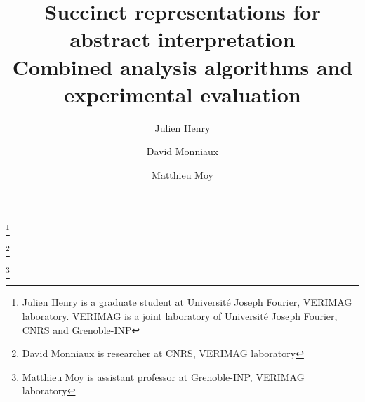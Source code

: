 \documentclass[a4paper]{amsart}
\begin{document}
\title[Succinct representations for abstract interpretation]{Succinct representations for abstract interpretation \\Combined analysis algorithms and experimental evaluation}

\author{Julien Henry}
\address{J. Henry\\VERIMAG\\2 av de Vignate\\38610 Gières\\France}
\thanks{Julien Henry is a graduate student at Université Joseph Fourier, VERIMAG laboratory. VERIMAG is a joint laboratory of Université Joseph Fourier, CNRS and Grenoble-INP}

\author{David Monniaux}
\address{D. Monniaux\\VERIMAG\\2 av de Vignate\\38610 Gières\\France}
\thanks{David Monniaux is researcher at CNRS, VERIMAG laboratory}

\author{Matthieu Moy}
\address{M. Moy\\VERIMAG\\2 av de Vignate\\38610 Gières\\France}
\thanks{Matthieu Moy is assistant professor at Grenoble-INP, VERIMAG laboratory}


\begin{abstract}

\end{abstract}

\maketitle



\FloatBarrier



\end{document}
